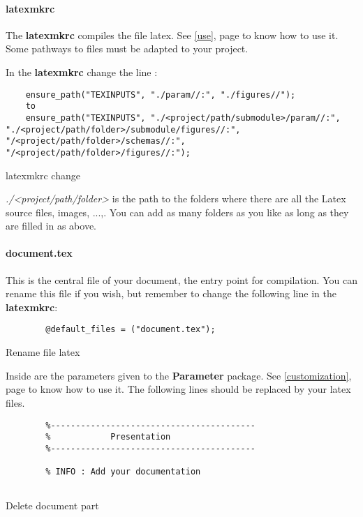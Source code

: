 \paragraph{latexmkrc}
The \textbf{latexmkrc} compiles the file \gls{latex}. See \ref{use}, page \pageref{use} to know how
to use it.
Some pathways to files must be adapted to your project.

In the \textbf{latexmkrc} change the line :
\begin{code}
    \begin{verbatim}
    ensure_path("TEXINPUTS", "./param//:", "./figures//");
    to
    ensure_path("TEXINPUTS", "./<project/path/submodule>/param//:", "./<project/path/folder>/submodule/figures//:", "/<project/path/folder>/schemas//:", "/<project/path/folder>/figures//:");
\end{verbatim}
    \caption{latexmkrc change}
\end{code}

\emph{./<project/path/folder>} is the path to the folders where there are all the Latex source
files, images, ...,.
You can add as many folders as you like as long as they are filled in as above.

\paragraph{document.tex}
This is the central file of your document, the entry point for compilation.
You can rename this file if you wish, but remember to change the following line in the
\textbf{latexmkrc}:

\begin{code}
    \begin{verbatim}
        @default_files = ("document.tex");
    \end{verbatim}
    \caption{Rename file \gls{latex}}
\end{code}

Inside are the parameters given to the \textbf{Parameter} package. See \ref{customization}, page
\pageref{customization} to know how to use it.
The following lines should be replaced by your \gls{latex} files.

\begin{code}
    \begin{verbatim}
        %-----------------------------------------
        %            Presentation
        %-----------------------------------------

        % INFO : Add your documentation
        
    \end{verbatim}
    \caption{Delete document part}
\end{code}

